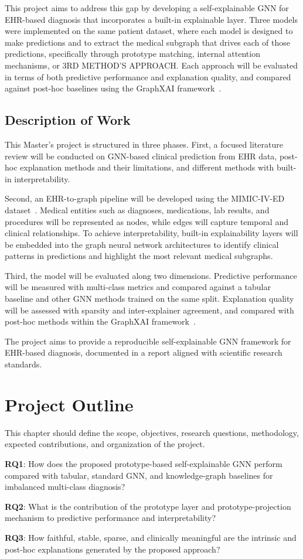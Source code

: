 This project aims to address this gap by developing a self-explainable GNN for EHR-based diagnosis that incorporates a built-in explainable layer. Three models were implemented on the same patient dataset, where each model is designed to make predictions and to extract the medical subgraph that drives each of those predictions, specifically through prototype matching, internal attention mechanisms, or 3RD METHOD'S APPROACH. Each approach will be evaluated in terms of both predictive performance and explanation quality, and compared against post-hoc baselines using the GraphXAI framework~\cite{agarwal2023graphxai}.

\section{Description of Work}
This Master's project is structured in three phases. First, a focused literature review will be conducted on GNN-based clinical prediction from EHR data, post-hoc explanation methods and their limitations, and different methods with built-in interpretability.

Second, an EHR-to-graph pipeline will be developed using the MIMIC-IV-ED dataset~\cite{johnson2023mimicived}. Medical entities such as diagnoses, medications, lab results, and procedures will be represented as nodes, while edges will capture temporal and clinical relationships. To achieve interpretability, built-in explainability layers will be embedded into the graph neural network architectures to identify clinical patterns in predictions and highlight the most relevant medical subgraphs.

Third, the model will be evaluated along two dimensions. Predictive performance will be measured with multi-class metrics and compared against a tabular baseline and other GNN methods trained on the same split. Explanation quality will be assessed with sparsity and inter-explainer agreement, and compared with post-hoc methods within the GraphXAI framework~\cite{agarwal2023graphxai}.

The project aims to provide a reproducible self-explainable GNN framework for EHR-based diagnosis, documented in a report aligned with scientific research standards.

\chapter{Project Outline}

This chapter should define the scope, objectives, research questions, methodology, expected contributions, and organization of the project.

\textbf{RQ1}: How does the proposed prototype-based self-explainable GNN perform compared with tabular, standard GNN, and knowledge-graph baselines for imbalanced multi-class diagnosis?

\textbf{RQ2}: What is the contribution of the prototype layer and prototype-projection mechanism to predictive performance and interpretability?

\textbf{RQ3}: How faithful, stable, sparse, and clinically meaningful are the intrinsic and post-hoc explanations generated by the proposed approach?

